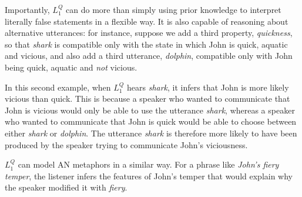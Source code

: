 \documentclass[9pt,twocolumn,twoside,lineno]{pnas-new}
\newcommand{\Listener}{L}
\newcommand{\QLONE}{\Listener_{{1}}^{{Q}}}
\begin{document}
	Importantly, $\QLONE$ can do more than simply using prior knowledge to interpret literally false statements in a flexible way. It is also capable of reasoning about alternative utterances: for instance, suppose we add a third property, \emph{quickness}, so that \emph{shark} is compatible only with the state in which John is quick, aquatic and vicious, and also add a third utterance, \emph{dolphin}, compatible only with John being quick, aquatic and \emph{not} vicious.

	
	In this second example, when $\QLONE$ hears \emph{shark}, it infers that John is more likely vicious than quick. This is because a speaker who wanted to communicate that John is vicious would only be able to use the utterance \emph{shark}, whereas a speaker who wanted to communicate that John is quick would be able to choose between either \emph{shark} or \emph{dolphin}. The utterance \emph{shark} is therefore more likely to have been produced by the speaker trying to communicate John's viciousness.

	



	$\QLONE$ can model AN metaphors in a similar way. For a phrase like \emph{John's fiery temper}, the listener infers the features of John's temper that would explain why the speaker modified it with \emph{fiery}.

\end{document}
